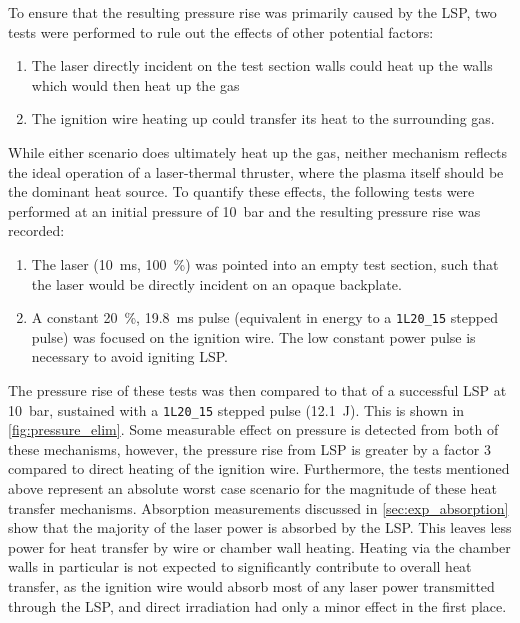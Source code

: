             
            To ensure that the resulting pressure rise was primarily caused by the LSP, two tests were performed to rule out the effects of other potential factors:
            \begin{enumerate}
                \item The laser directly incident on the test section walls could heat up the walls which would then heat up the gas
                \item The ignition wire heating up could transfer its heat to the surrounding gas.
            \end{enumerate}
            While either scenario does ultimately heat up the gas, neither mechanism reflects the ideal operation of a laser-thermal thruster, where the plasma itself should be the dominant heat source. To quantify these effects, the following tests were performed at an initial pressure of \qty{10}{bar} and the resulting pressure rise was recorded:
            \begin{enumerate}
                \item The laser (\qty{10}{ms}, 100~\%) was pointed into an empty test section, such that the laser would be directly incident on an opaque backplate.
                \item A constant 20~\%, \qty{19.8}{ms} pulse (equivalent in energy to a \texttt{1L20\_15} stepped pulse) was focused on the ignition wire. The low constant power pulse is necessary to avoid igniting LSP.
            \end{enumerate}
            The pressure rise of these tests was then compared to that of a successful LSP at \qty{10}{bar}, sustained with a \texttt{1L20\_15} stepped pulse (\qty{12.1}{J}). This is shown in \autoref{fig:pressure_elim}. Some measurable effect on pressure is detected from both of these mechanisms, however, the pressure rise from LSP is greater by a factor 3 compared to direct heating of the ignition wire. Furthermore, the tests mentioned above represent an absolute worst case scenario for the magnitude of these heat transfer mechanisms. Absorption measurements discussed in \autoref{sec:exp_absorption} show that the majority of the laser power is absorbed by the LSP. This leaves less power for heat transfer by wire or chamber wall heating. Heating via the chamber walls in particular is not expected to significantly contribute to overall heat transfer, as the ignition wire would absorb most of any laser power transmitted through the LSP, and direct irradiation had only a minor effect in the first place.

